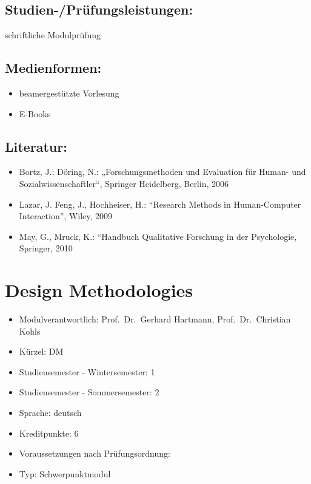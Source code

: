 \section*{Studien-/Prüfungsleistungen:}\label{studien-pruxfcfungsleistungen-3}

schriftliche Modulprüfung

\section*{Medienformen:}\label{medienformen-3}

\begin{itemize}
\item
  beamergestützte Vorlesung
\item
  E-Books
\end{itemize}

\section*{Literatur:}\label{literatur-3}

\begin{itemize}
\item
  Bortz, J.; Döring, N.: „Forschungsmethoden und Evaluation für Human-
  und Sozialwissenschaftler``, Springer Heidelberg, Berlin, 2006
\item
  Lazar, J. Feng, J., Hochheiser, H.: ``Research Methods in
  Human-Computer Interaction'', Wiley, 2009
\item
  May, G., Mruck, K.: ``Handbuch Qualitative Forschung in der
  Psychologie, Springer, 2010
\end{itemize}

\chapter{Design Methodologies}\label{design-methodologies}

\begin{itemize}
\tightlist
\item
  Modulverantwortlich: Prof.~Dr.~Gerhard Hartmann, Prof.~Dr.~Christian
  Kohls
\item
  Kürzel: DM
\item
  Studiensemester - Wintersemester: 1
\item
  Studiensemester - Sommersemester: 2
\item
  Sprache: deutsch
\item
  Kreditpunkte: 6
\item
  Voraussetzungen nach Prüfungsordnung:
\item
  Typ: Schwerpunktmodul
\end{itemize}

